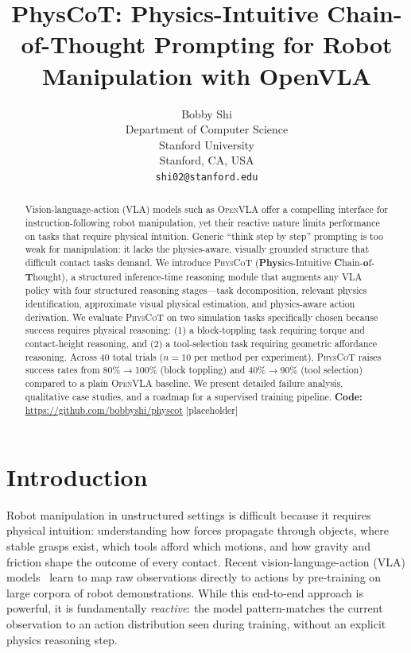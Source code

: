 \documentclass{article}
\title{PhysCoT: Physics-Intuitive Chain-of-Thought Prompting for Robot Manipulation with OpenVLA}
\author{%
  Bobby Shi\\
  Department of Computer Science\\
  Stanford University\\
  Stanford, CA, USA\\
  \texttt{shi02@stanford.edu}\\
}
\newcommand{\physcot}{\textsc{PhysCoT}}
\newcommand{\openvla}{\textsc{OpenVLA}}
\begin{document}
\maketitle

\begin{abstract}
Vision-language-action (VLA) models such as \openvla{} offer a compelling interface
for instruction-following robot manipulation, yet their reactive nature limits performance
on tasks that require physical intuition.
Generic ``think step by step'' prompting is too weak for manipulation:
it lacks the physics-aware, visually grounded structure that difficult contact tasks demand.
We introduce \physcot{} (\textbf{Phys}ics-Intuitive \textbf{C}hain-\textbf{o}f-\textbf{T}hought),
a structured inference-time reasoning module that augments any VLA policy with
four structured reasoning stages—task decomposition, relevant physics identification,
approximate visual physical estimation, and physics-aware action derivation.
We evaluate \physcot{} on two simulation tasks specifically chosen because
success requires physical reasoning:
(1) a block-toppling task requiring torque and contact-height reasoning,
and (2) a tool-selection task requiring geometric affordance reasoning.
Across 40 total trials (\(n = 10\) per method per experiment),
\physcot{} raises success rates from 80\%$\to$100\% (block toppling)
and 40\%$\to$90\% (tool selection) compared to a plain \openvla{} baseline.
We present detailed failure analysis, qualitative case studies, and a
roadmap for a supervised training pipeline.
\textbf{Code:} \url{https://github.com/bobbyshi/physcot} [placeholder]
\end{abstract}

\section{Introduction}
\label{sec:intro}

Robot manipulation in unstructured settings is difficult because it requires
physical intuition: understanding how forces propagate through objects,
where stable grasps exist, which tools afford which motions, and how gravity
and friction shape the outcome of every contact.
Recent vision-language-action (VLA) models~\citep{brohan2023rt2, kim2024openvla}
learn to map raw observations directly to actions by pre-training on large
corpora of robot demonstrations.
While this end-to-end approach is powerful, it is fundamentally \emph{reactive}:
the model pattern-matches the current observation to an action distribution seen
during training, without an explicit physics reasoning step.
\end{document}
